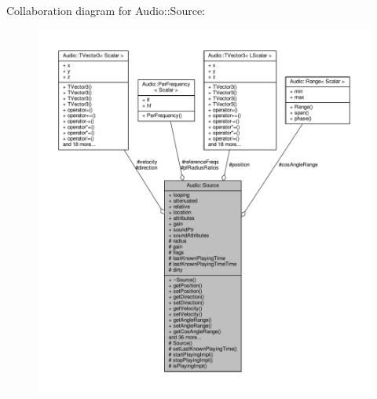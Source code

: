 Collaboration diagram for Audio\+:\+:Source\+:
\nopagebreak
\begin{figure}[H]
\begin{center}
\leavevmode
\includegraphics[width=350pt]{d8/dab/classAudio_1_1Source__coll__graph}
\end{center}
\end{figure}
